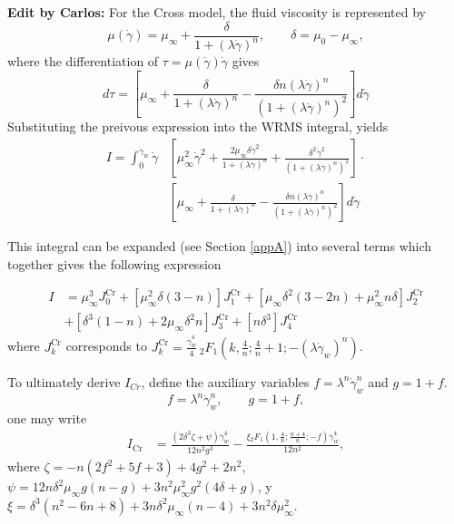 \documentclass[lineno]{jfm}
\newcommand{\cbp}[1]{{\color{blue} \textbf{Edit by Carlos:} #1}}
\begin{document}
\cbp{For the Cross model, the fluid viscosity is represented by
\[
\mu(\dot{\gamma})
=
\mu_{\infty}
+
\frac{\delta}{1+(\lambda\dot{\gamma})^n},
\qquad
\delta=\mu_0-\mu_{\infty},
\]
where the differentiation of $\tau=\mu(\dot{\gamma})\dot{\gamma}$ gives
\begin{equation}
    d\tau = \left[ \mu_\infty + \frac{\delta}{1 + (\lambda \dot{\gamma})^n} - \frac{\delta n (\lambda \dot{\gamma})^n}{\left(1 + (\lambda \dot{\gamma})^n\right)^2} \right] d\dot{\gamma}\label{eq:dtau_dgamma_Cross}
\end{equation}
Substituting the preivous expression into the WRMS integral, yields
\begin{align}
    I = \int_0^{\dot{\gamma}_w} \dot{\gamma} & \left[ \mu_\infty^2 \dot{\gamma}^2 + \frac{2\mu_\infty \delta \dot{\gamma}^2}{1 + (\lambda \dot{\gamma})^n} + \frac{\delta^2 \dot{\gamma}^2}{\left(1 + (\lambda \dot{\gamma})^n\right)^2} \right] \cdot \nonumber \\
    & \left[ \mu_\infty + \frac{\delta}{1 + (\lambda \dot{\gamma})^n} - \frac{\delta n (\lambda \dot{\gamma})^n}{\left(1 + (\lambda \dot{\gamma})^n\right)^2} \right] d\dot{\gamma}
    \label{Int:Cross}
\end{align}

This integral can be expanded (see Section \ref{appA}) into several terms which together gives the following expression

\begin{align}
I &= \mu_{\infty}^3 J_0^{\mathrm{Cr}} + \left[ \mu_{\infty}^2 \delta (3 - n) \right] J_1^{\mathrm{Cr}} + \left[ \mu_{\infty} \delta^2 (3 - 2n) + \mu_{\infty}^2 n \delta \right] J_2^{\mathrm{Cr}} \nonumber \\
&+ \left[ \delta^3 (1 - n) + 2\mu_{\infty} \delta^2 n \right] J_3^{\mathrm{Cr}} + \left[ n \delta^3 \right] J_4^{\mathrm{Cr}}
\end{align}
where $J_k^{\mathrm{Cr}}$ corresponds to $J_k^{\mathrm{Cr}}=\frac{\dot{\gamma}_w^4}{4} \, _2F_1\left(k, \frac{4}{n}; \frac{4}{n}+1; -(\lambda \dot{\gamma}_w)^n\right)$.

To ultimately derive $I_{Cr}$, \citet{Sochi2015} define the auxiliary variables $f=\lambda^n\dot{\gamma}_w^n$ and $g=1+f$.
\begin{equation}
f=\lambda^n\dot{\gamma}_w^n,
\qquad
g=1+f,
\label{eq:fg_cross}
\end{equation}
one may write
\begin{align}
I_{\mathrm{Cr}}
&=
\frac{\left( 2\delta^3 \zeta + \psi \right) \dot{\gamma}_w^4}{12n^2 g^3}
-\frac{\xi
{}_2F_1 \left(1, \frac{4}{n}; \frac{n+4}{n}; -f\right)\dot{\gamma}_w^4}{12n^2},
\label{eq:cross_integral_solution}
\end{align} where $\zeta=-n (2f^2 + 5f + 3) + 4g^2 + 2n^2$, $\psi=12n\delta^2 \mu_\infty g (n - g) + 3n^2\mu_\infty^2 g^2(4\delta + g)$, y $\xi=\delta^3 (n^2 - 6n + 8) + 3n\delta^2\mu_\infty (n - 4) + 3n^2\delta\mu_\infty^2$.} 
\end{document}
